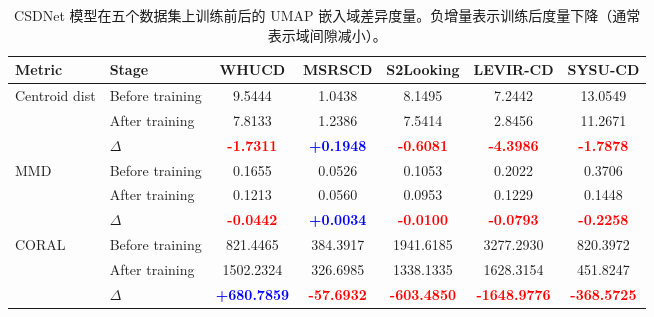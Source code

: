 \begin{table}[!htbp]
\centering
\caption{CSDNet 模型的消融实验结果 (IoU \%)}
\label{tab:csdnet_ablation}
\end{table}

\begin{table}[!htbp]
\centering
\scriptsize
\setlength{\tabcolsep}{3pt} %
\caption{CSDNet 模型在五个数据集上训练前后的 UMAP 嵌入域差异度量。负增量表示训练后度量下降（通常表示域间隙减小）。}
\label{tab:domain_metrics_transposed_improved_delta}
\begin{tabular}{l l c c c c c}
\toprule
Metric & Stage & {WHUCD} & {MSRSCD} & {S2Looking} & {LEVIR-CD} & {SYSU-CD} \\
\midrule
\multirow{3}{*}{Centroid dist} 
  & Before training & 9.5444 & 1.0438 & 8.1495 & 7.2442  & 13.0549 \\
  & After training  & 7.8133 & 1.2386 & 7.5414 & 2.8456  & 11.2671 \\
  & $\Delta$ & \textcolor{red}{\textbf{-1.7311}} & \textcolor{blue}{\textbf{+0.1948}} & \textcolor{red}{\textbf{-0.6081}} & \textcolor{red}{\textbf{-4.3986}} & \textcolor{red}{\textbf{-1.7878}} \\
\midrule
\multirow{3}{*}{MMD} 
  & Before training & 0.1655 & 0.0526 & 0.1053 & 0.2022 & 0.3706 \\
  & After training  & 0.1213 & 0.0560 & 0.0953 & 0.1229 & 0.1448 \\
  & $\Delta$ & \textcolor{red}{\textbf{-0.0442}} & \textcolor{blue}{\textbf{+0.0034}} & \textcolor{red}{\textbf{-0.0100}} & \textcolor{red}{\textbf{-0.0793}} & \textcolor{red}{\textbf{-0.2258}} \\
\midrule
\multirow{3}{*}{CORAL} 
  & Before training & 821.4465  & 384.3917  & 1941.6185 & 3277.2930 & 820.3972 \\
  & After training  & 1502.2324 & 326.6985  & 1338.1335 & 1628.3154 & 451.8247 \\
  & $\Delta$ & \textcolor{blue}{\textbf{+680.7859}} & \textcolor{red}{\textbf{-57.6932}} & \textcolor{red}{\textbf{-603.4850}} & \textcolor{red}{\textbf{-1648.9776}} & \textcolor{red}{\textbf{-368.5725}} \\
\bottomrule
\end{tabular}
\end{table}

